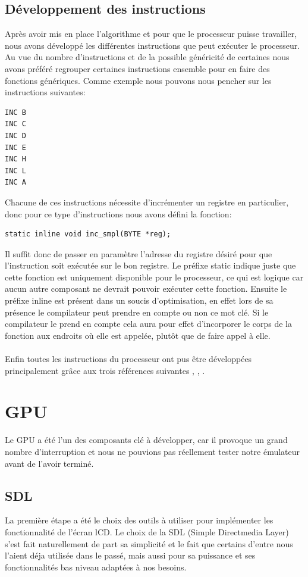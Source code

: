 \documentclass{report}
\begin{document}
\subsection{Développement des instructions}
Après avoir mis en place l'algorithme et pour que le processeur puisse travailler, nous avons développé les différentes instructions que peut exécuter le processeur. Au vue du nombre d'instructions et de la possible généricité de certaines nous avons préféré regrouper certaines instructions ensemble pour en faire des fonctions génériques. Comme exemple nous pouvons nous pencher sur les instructions suivantes:
\begin{lstlisting}
INC B
INC C
INC D
INC E
INC H
INC L
INC A
\end{lstlisting}
Chacune de ces instructions nécessite d'incrémenter un registre en particulier, donc pour ce type d'instructions nous avons défini la fonction:
\begin{lstlisting}
static inline void inc_smpl(BYTE *reg);
\end{lstlisting}
Il suffit donc de passer en paramètre l'adresse du registre désiré pour que l'instruction soit exécutée sur le bon registre.
Le préfixe static indique juste que cette fonction est uniquement disponible pour le processeur, ce qui est logique car aucun autre composant ne devrait pouvoir exécuter cette fonction. Ensuite le préfixe inline est présent dans un soucis d'optimisation, en effet lors de sa présence le compilateur peut prendre en compte ou non ce mot clé. Si le compilateur le prend en compte cela aura pour effet d'incorporer le corps de la fonction aux endroits où elle est appelée, plutôt que de faire appel à elle.\\\\ 
Enfin toutes les instructions du processeur ont pus être développées principalement grâce aux trois références suivantes \cite{pastraiser}, \cite{clrhome}, \cite{pinaud}.
\section{GPU}
Le GPU a été l'un des composants clé à développer, car il provoque un grand nombre d'interruption et nous ne pouvions pas réellement tester notre émulateur avant de l'avoir terminé.\\

\subsection{SDL}
	La première étape a été le choix des outils à utiliser pour implémenter les fonctionnalité de l'écran lCD. Le choix de la SDL (Simple Directmedia Layer) s'est fait naturellement de part sa simplicité et le fait que certains d'entre nous l'aient déja utilisée dans le passé, mais aussi pour sa puissance et ses fonctionnalités bas niveau adaptées à nos besoins.\\
\end{document}
